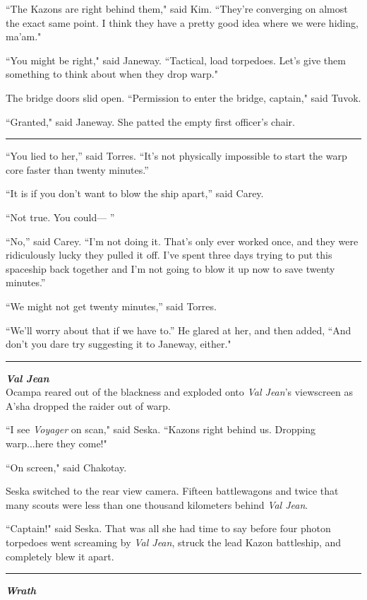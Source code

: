 \documentclass[twoside,letterpaper,12pt]{memoir}
\begin{document}
``The Kazons are right behind them," said Kim. ``They're converging on almost the exact same point. I think they have a pretty good idea where we were hiding, ma'am."

``You might be right," said Janeway. ``Tactical, load torpedoes. Let's give them something to think about when they drop warp."

The bridge doors slid open. ``Permission to enter the bridge, captain," said Tuvok.

``Granted," said Janeway. She patted the empty first officer's chair.

\fancybreak{\rule{3cm}{0.4 pt}}
``You lied to her,” said Torres. ``It’s not physically impossible to start the warp core faster than twenty minutes.”

``It is if you don’t want to blow the ship apart,” said Carey.

``Not true. You could--- ”

``No,” said Carey. ``I’m not doing it. That’s only ever worked once, and they were ridiculously lucky they pulled it off. I’ve spent three days trying to put this spaceship back together and I’m not going to blow it up now to save twenty minutes.”

``We might not get twenty minutes,” said Torres.

``We’ll worry about that if we have to.” He glared at her, and then added, ``And don't you dare try suggesting it to Janeway, either."

\fancybreak{\rule{3cm}{0.4 pt}}
\noindent\textit{\textbf{Val Jean}}\\

Ocampa reared out of the blackness and exploded onto \textit{Val Jean}'s viewscreen as A'sha dropped the raider out of warp.

``I see \textit{Voyager} on scan," said Seska. ``Kazons right behind us. Dropping warp...here they come!"

``On screen," said Chakotay.

Seska switched to the rear view camera. Fifteen battlewagons and twice that many scouts were less than one thousand kilometers behind \textit{Val Jean}.

``Captain!" said Seska. That was all she had time to say before four photon torpedoes went screaming by \textit{Val Jean}, struck the lead Kazon battleship, and completely blew it apart.

\fancybreak{\rule{3cm}{0.4 pt}}
\noindent\textit{\textbf{Wrath}}\\
\end{document}
